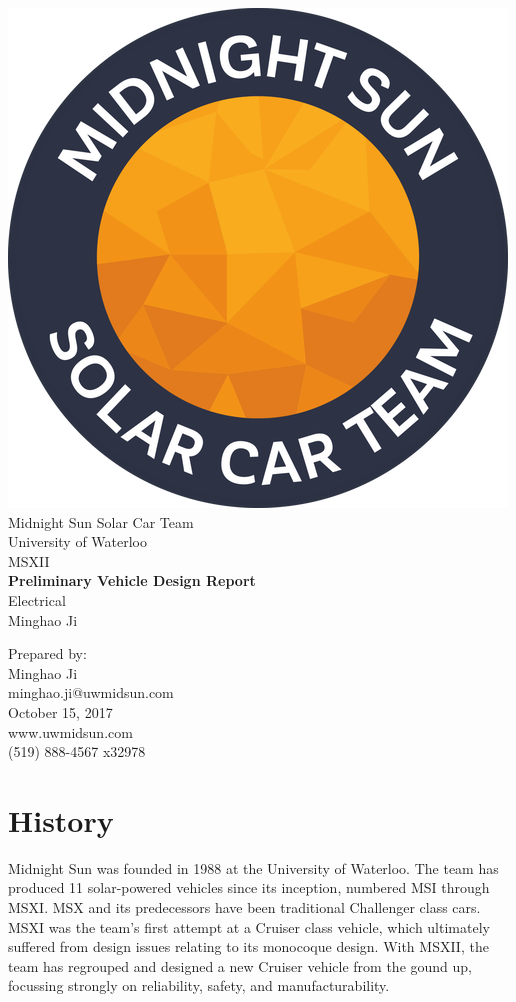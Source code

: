 \documentclass[10pt]{article}
\makeatletter
\newcommand\theteamname{Midnight Sun Solar Car Team} %
\newcommand\theuniversityname{University of Waterloo} %
\newcommand\theteamwebsite{www.uwmidsun.com} %
\newcommand\theteamphone{(519) 888-4567 x32978} %
\newcommand\thetitle{Preliminary Vehicle Design Report} %
\newcommand\thesubtitle{Electrical} %
\newcommand\theauthor{Minghao Ji} %
\newcommand\theauthorcontact{minghao.ji@uwmidsun.com} %
\newcommand\thedate{October 15, 2017} %
\makeatother
\begin{document}



\begin{titlepage}
\large
\vspace*{2cm}
\centering
\includegraphics[width=.25\textwidth]{./figures/midnightSunLogoCircle.png} \\
\vspace{1.5cm}
{\LARGE \theteamname} \\
\theuniversityname \\
\vspace{2.2cm}
{\LARGE MSXII} \\
\vspace{0.4cm}
{\huge\bfseries \thetitle} \\
\vspace{0.2cm}
{\LARGE \thesubtitle} \\
\vspace{2.2cm}
\ifdefined \theauthor
\par Prepared by: \\
\theauthor \\
\theauthorcontact \\
\fi
\thedate \\
\vfill
\theteamwebsite \\
\theteamphone
\end{titlepage}

\tableofcontents
\listoffigures %

\section{History}
Midnight Sun was founded in 1988 at the University of Waterloo. The team has produced 11 solar-powered vehicles since its inception, numbered MSI through MSXI. MSX and its predecessors have been traditional Challenger class cars. MSXI was the team's first attempt at a Cruiser class vehicle, which ultimately suffered from design issues relating to its monocoque design. With MSXII, the team has regrouped and designed a new Cruiser vehicle from the gound up, focussing strongly on reliability, safety, and manufacturability.
\end{document}
